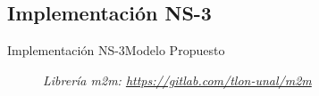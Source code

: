 \subsection{Implementación NS-3}
\begin{frame}{Implementación NS-3}{Modelo Propuesto}	
    \begin{figure}				
		\caption{\small \sl Librería m2m: \url{https://gitlab.com/tlon-unal/m2m}\\}
		\label{figure:ImplementacionNS3}
    \end{figure}
\end{frame}
